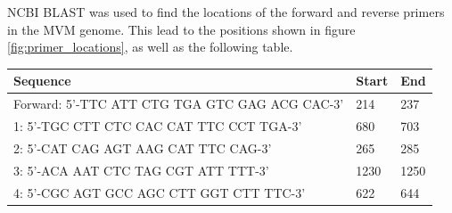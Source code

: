 \documentclass[a4paper,english]{scrreprt}
\begin{document}
NCBI BLAST \cite{website:blast} was used to find the locations of the forward
and reverse primers in the MVM genome. This lead to the positions shown in
figure \ref{fig:primer_locations}, as well as the following table.
\\

\begin{tabu}{lll}
	\toprule
	Sequence & Start & End \\
	\midrule
	Forward: 5’-TTC ATT CTG TGA GTC GAG ACG CAC-3’ & 214 & 237 \\
	1: 5’-TGC CTT CTC CAC CAT TTC CCT TGA-3’ & 680 & 703 \\
	2: 5’-CAT CAG AGT AAG CAT TTC CAG-3’ & 265 & 285 \\
	3: 5’-ACA AAT CTC TAG CGT ATT TTT-3’ & 1230 & 1250 \\
	4: 5’-CGC AGT GCC AGC CTT GGT CTT TTC-3’ & 622 & 644 \\
	\bottomrule
\end{tabu}
\\
\end{document}

